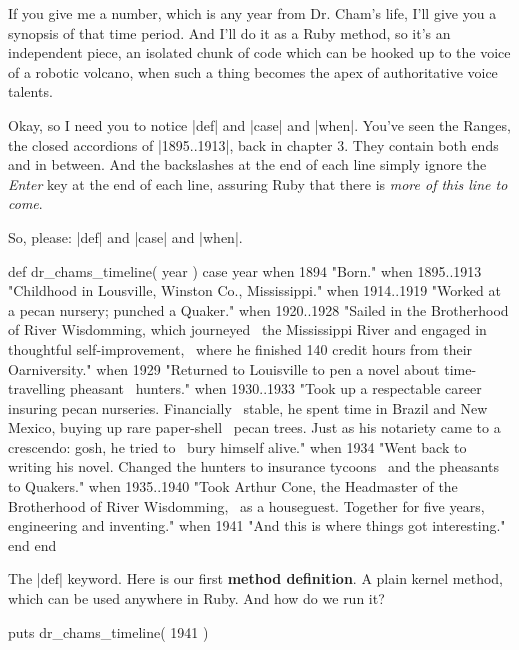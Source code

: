 \documentclass[12pt,twoside]{report}
\begin{document}
If you give me a number, which is any year from Dr. Cham's life, I'll
give you a synopsis of that time period.  And I'll do it as a Ruby
method, so it's an independent piece, an isolated chunk of code which
can be hooked up to the voice of a robotic volcano, when such a thing
becomes the apex of authoritative voice talents.

Okay, so I need you to notice \rubyinline|def| and
\rubyinline|case| and
\rubyinline|when|.  You've seen the Ranges, the closed
accordions of \rubyinline|1895..1913|, back in chapter
3.  They contain both ends and in between.  And the backslashes at the
end of each line simply ignore the {\em Enter} key at the end of each
line, assuring Ruby that there is {\em more of this line to come}.

So, please: \rubyinline|def| and
\rubyinline|case| and
\rubyinline|when|.


\begin{rubycode}

 def dr_chams_timeline( year )
   case year
   when 1894
     "Born."
   when 1895..1913
     "Childhood in Lousville, Winston Co., Mississippi."
   when 1914..1919
     "Worked at a pecan nursery; punched a Quaker."
   when 1920..1928
     "Sailed in the Brotherhood of River Wisdomming, which journeyed \
      the Mississippi River and engaged in thoughtful self-improvement, \
      where he finished 140 credit hours from their Oarniversity."
   when 1929
     "Returned to Louisville to pen a novel about time-travelling pheasant \
      hunters."
   when 1930..1933
     "Took up a respectable career insuring pecan nurseries.  Financially \
      stable, he spent time in Brazil and New Mexico, buying up rare paper-shell \
      pecan trees.  Just as his notariety came to a crescendo: gosh, he tried to \
      bury himself alive."
   when 1934
     "Went back to writing his novel.  Changed the hunters to insurance tycoons \
      and the pheasants to Quakers."
   when 1935..1940
     "Took Arthur Cone, the Headmaster of the Brotherhood of River Wisdomming, \
      as a houseguest.  Together for five years, engineering and inventing."
   when 1941
     "And this is where things got interesting."
   end
 end

\end{rubycode}


The \rubyinline|def| keyword.  Here is our first {\bf
  method definition}.  A plain kernel method, which can be used
anywhere in Ruby.  And how do we run it?


\begin{rubycode}

 puts dr_chams_timeline( 1941 )

\end{rubycode}
\end{document}
